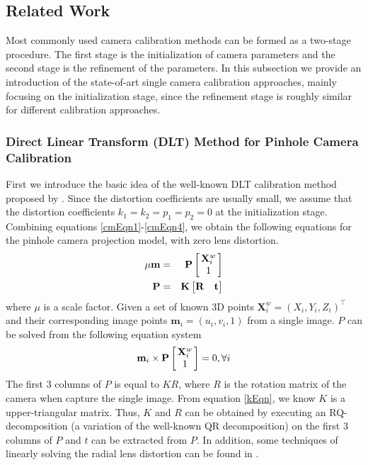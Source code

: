 \documentclass{report}
\begin{document}
\subsection{Related Work}
Most commonly used camera calibration methods can be formed as a two-stage procedure. The first stage is the initialization of camera parameters and the second stage is the refinement of the parameters. In this subsection we provide an introduction of the state-of-art single camera calibration approaches, mainly focusing on the initialization stage, since the refinement stage is roughly similar for different calibration approaches. 

\subsubsection{Direct Linear Transform (DLT) Method for Pinhole Camera Calibration}
First we introduce the basic idea of the well-known DLT calibration method proposed by \cite{abdelaziz1971}. Since the distortion coefficients are usually small, we assume that the distortion coefficients $k_1 = k_2 = p_1 = p_2 = 0$ at the initialization stage. Combining equations \ref{cmEqn1}-\ref{cmEqn4}, we obtain the following equations for the pinhole camera projection model, with zero lens distortion. 
\begin{eqnarray}
\mu \mathbf{m} &=& \mathbf{P} 
\arraycolsep=1.5pt%
\begin{bmatrix}
	\begin{array}{c}
	\mathbf{X}^w_i \\ 1
	\end{array}
\end{bmatrix} \\
\mathbf{P} &=& \mathbf{K} 
\begin{bmatrix}
\mathbf{R} & \mathbf{t}
\end{bmatrix} 
\end{eqnarray}
where $\mu$ is a scale factor. Given a set of known 3D points $\mathbf{X}^w_i = (X_i, Y_i, Z_i)^\top$ and their corresponding image points $\mathbf{m}_i = (u_i, v_i, 1)$ from a single image. $P$ can be solved from the following equation system 
\begin{equation}
\mathbf{m}_i \times \mathbf{P} 
\arraycolsep=1.5pt%
\begin{bmatrix}
	\begin{array}{c}
	\mathbf{X}^w_i \\ 1
	\end{array}
\end{bmatrix}
 = 0, \forall i
\label{dltLS}
\end{equation}
The first 3 columns of $P$ is equal to $K R$, where $R$ is the rotation matrix of the camera when capture the single image. From equation \ref{kEqn}, we know $K$ is a upper-triangular matrix. Thus, $K$ and $R$ can be obtained by executing an RQ-decomposition (a variation of the well-known QR decomposition) on the first 3 columns of $P$ and $t$ can be extracted from $P$. In addition, some techniques of linearly solving the radial lens distortion can be found in \cite{abdelaziz1971}. 
\end{document}
